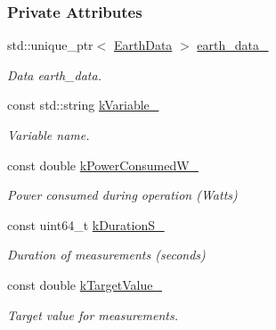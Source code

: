 \subsubsection*{Private Attributes}
\begin{DoxyCompactItemize}
\item 
\mbox{\label{classosse_1_1collaborate_1_1_sensor_a2f9c4593a75c2de643ec70c79d1ff163}} 
std\+::unique\+\_\+ptr$<$ \hyperlink{classosse_1_1collaborate_1_1_earth_data}{Earth\+Data} $>$ \hyperlink{classosse_1_1collaborate_1_1_sensor_a2f9c4593a75c2de643ec70c79d1ff163}{earth\+\_\+data\+\_\+}
\begin{DoxyCompactList}\small\item\em Data earth\+\_\+data. \end{DoxyCompactList}\item 
\mbox{\label{classosse_1_1collaborate_1_1_sensor_ab6a0bde6a2ee07f5d6670d9d9497ae53}} 
const std\+::string \hyperlink{classosse_1_1collaborate_1_1_sensor_ab6a0bde6a2ee07f5d6670d9d9497ae53}{k\+Variable\+\_\+}
\begin{DoxyCompactList}\small\item\em Variable name. \end{DoxyCompactList}\item 
\mbox{\label{classosse_1_1collaborate_1_1_sensor_a46e0de0118d7af85016698b61c8a65c9}} 
const double \hyperlink{classosse_1_1collaborate_1_1_sensor_a46e0de0118d7af85016698b61c8a65c9}{k\+Power\+Consumed\+W\+\_\+}
\begin{DoxyCompactList}\small\item\em Power consumed during operation (Watts) \end{DoxyCompactList}\item 
\mbox{\label{classosse_1_1collaborate_1_1_sensor_a6ac32b4c1191cd73af547041255b1a26}} 
const uint64\+\_\+t \hyperlink{classosse_1_1collaborate_1_1_sensor_a6ac32b4c1191cd73af547041255b1a26}{k\+Duration\+S\+\_\+}
\begin{DoxyCompactList}\small\item\em Duration of measurements (seconds) \end{DoxyCompactList}\item 
\mbox{\label{classosse_1_1collaborate_1_1_sensor_a586ce80bf498a6a261361bceef3d79fa}} 
const double \hyperlink{classosse_1_1collaborate_1_1_sensor_a586ce80bf498a6a261361bceef3d79fa}{k\+Target\+Value\+\_\+}
\begin{DoxyCompactList}\small\item\em Target value for measurements. \end{DoxyCompactList}\end{DoxyCompactItemize}


